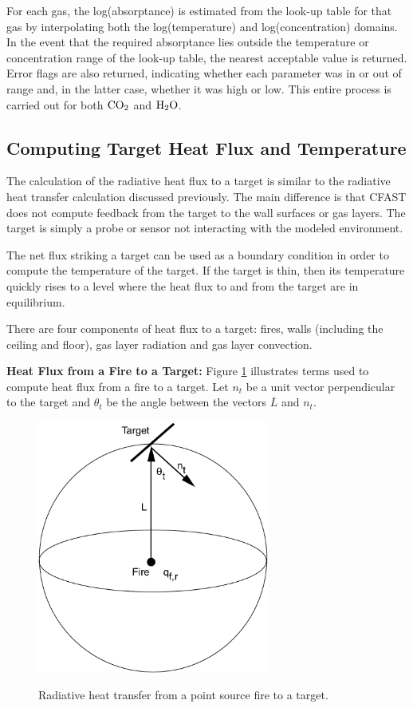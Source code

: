For each gas, the log(absorptance) is estimated from the look-up table for that gas  by  interpolating both the log(temperature) and log(concentration) domains. In the event that the required absorptance lies outside the temperature or concentration range of the look-up table, the nearest acceptable value is returned. Error flags are also returned, indicating whether each parameter was in or out of range and, in the latter case, whether it was high or low.  This entire process is carried out for both $\textnormal{CO}_2$  and $\textnormal{H}_2 \textnormal{O}$.

\subsection{Computing Target Heat Flux and Temperature}

The calculation of the radiative heat flux to a target is similar to the radiative heat transfer calculation discussed previously.  The main difference is that CFAST does not compute feedback from the target to the wall surfaces or gas layers.  The target is simply a probe or sensor not interacting with the modeled environment.

The net flux striking a target can be used as a boundary condition in order to compute the temperature of the target.  If the target is thin, then its temperature quickly rises to a level where the heat flux to and from the target are in equilibrium.

There are four components of heat flux to a target: fires, walls (including the ceiling and floor), gas layer radiation and gas layer convection.

{\bf Heat Flux from a Fire to a Target:} Figure \ref{fig:Rad_Fire} illustrates terms used to compute heat flux from a fire to a target. Let $n_t$ be a unit vector perpendicular to the target and $\theta_t$ be the angle between the vectors $\overline{L}$ and $n_t$.

\begin{figure}
\begin{center}
\includegraphics[width=3.0in]{FIGURES/Theory/Radiation_Fire}\\
\end{center}
\caption{Radiative heat transfer from a point source fire to a target.}
 \label{fig:Rad_Fire}
\end{figure}

